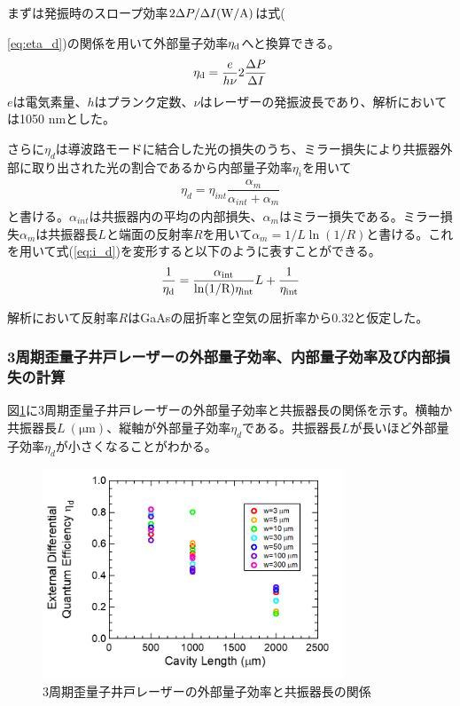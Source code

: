 まずは発振時のスロープ効率$2 \Delta P/\Delta I \rm{ (W/A)}$は式({\ref{eq:eta_d})の関係を用いて外部量子効率$\eta_{\rm{d}}$へと換算できる。
\begin{eqnarray}
\eta_{\rm{d}}=\dfrac{e}{h\nu}2\dfrac{\Delta P}{\Delta I} 
\label{eq:eta_d}
\end{eqnarray}
$e$は電気素量、$h$はプランク定数、$\nu$はレーザーの発振波長であり、解析においては1050 nmとした。


さらに$\eta_{d}$は導波路モードに結合した光の損失のうち、ミラー損失により共振器外部に取り出された光の割合であるから内部量子効率$\eta_{i}$を用いて
\begin{eqnarray}
\eta_{d}=\eta_{int}\dfrac{\alpha_{m}}{\alpha_{int} +\alpha_{m}}
\label{eq:i_d}
\end{eqnarray}
と書ける。$\alpha_{int}$は共振器内の平均の内部損失、$\alpha_{m}$はミラー損失である。ミラー損失$\alpha_{m}$は共振器長$L$と端面の反射率$R$を用いて$\alpha_{m}=1/L\ln (1/R)$と書ける。これを用いて式(\ref{eq:i_d})を変形すると以下のように表すことができる。
\begin{eqnarray}
\dfrac{1}{\eta_{\rm{d}}}=\dfrac{\alpha_{\rm{int}}}{\rm{ln}(1/R)\eta_{int}}L+\dfrac{1}{\eta_{\rm{int}}}
\label{eq:eta_inverse}
\end{eqnarray}



解析において反射率$R$はGaAsの屈折率と空気の屈折率から0.32と仮定した。

\subsubsection{3周期歪量子井戸レーザーの外部量子効率、内部量子効率及び内部損失の計算}
図\ref{fig:fig_3_1_3QW_broadcontact_id_02}に3周期歪量子井戸レーザーの外部量子効率と共振器長の関係を示す。横軸か共振器長$L\ (\si{\micro\metre})$、縦軸が外部量子効率$\eta_{d}$である。共振器長$L$が長いほど外部量子効率$\eta_{d}$が小さくなることがわかる。

\begin{figure}[h]
	\centering
	\includegraphics[width=9cm]{figure/fig_3_1_3QW_broadcontact_id_02.png}
	\caption{3周期歪量子井戸レーザーの外部量子効率と共振器長の関係}
	\label{fig:fig_3_1_3QW_broadcontact_id_02}
\end{figure}

}
